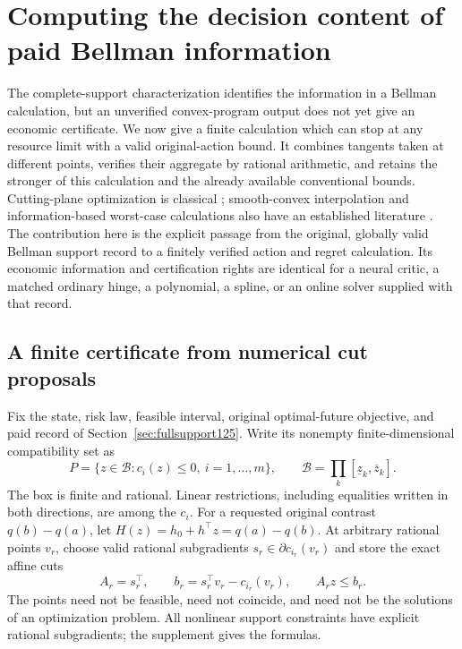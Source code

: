 \section{Computing the decision content of paid Bellman information}
\label{sec:computed126}

The complete-support characterization identifies the information in a
Bellman calculation, but an unverified convex-program output does not yet
give an economic certificate. We now give a finite calculation which can
stop at any resource limit with a valid original-action bound. It combines
tangents taken at different points, verifies their aggregate by rational
arithmetic, and retains the stronger of this calculation and the already
available conventional bounds. Cutting-plane optimization is classical
\citep{Kelley1960Cuts126}; smooth-convex interpolation and information-based
worst-case calculations also have an established literature
\citep{THG2017Interpolation122,FloreaNesterov2024Oracle125}. The contribution
here is the explicit passage from the original, globally valid Bellman
support record to a finitely verified action and regret calculation. Its
economic information and certification rights are identical for a neural
critic, a matched ordinary hinge, a polynomial, a spline, or an online
solver supplied with that record.

\subsection{A finite certificate from numerical cut proposals}

Fix the state, risk law, feasible interval, original optimal-future
objective, and paid record of Section~\ref{sec:fullsupport125}. Write its
nonempty finite-dimensional compatibility set as
\[
 P=\{z\in\mathcal B:c_i(z)\le0,
                \ i=1,\ldots,m\},\qquad
 \mathcal B=\prod_k[\underline z_k,\overline z_k].
\]
The box is finite and rational. Linear restrictions, including equalities
written in both directions, are among the $c_i$. For a requested original
contrast $q(b)-q(a)$, let $H(z)=h_0+h^\top z=q(a)-q(b)$.
At arbitrary rational points $v_r$, choose valid rational subgradients
$s_r\in\partial c_{i_r}(v_r)$ and store the exact affine cuts
\[
 A_r=s_r^\top,\qquad b_r=s_r^\top v_r-c_{i_r}(v_r),
 \qquad A_rz\le b_r.
\]
The points need not be feasible, need not coincide, and need not be the
solutions of an optimization problem. All nonlinear support constraints
have explicit rational subgradients; the supplement gives the formulas.

